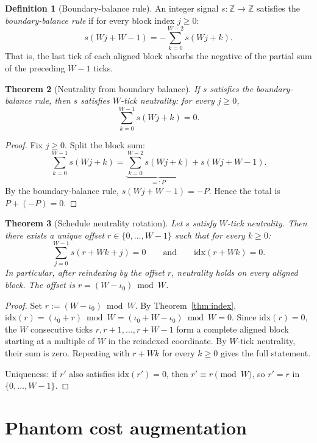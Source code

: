 \documentclass[11pt]{amsart}
\newtheorem{theorem}{Theorem}[section]
\theoremstyle{definition}
\newtheorem{definition}[theorem]{Definition}
\theoremstyle{remark}
\newcommand{\Z}{\mathbb{Z}}
\begin{document}
\begin{definition}[Boundary-balance rule]\label{def:boundary-balance}
An integer signal $s:\Z\to\Z$ satisfies the \emph{boundary-balance rule}
if for every block index $j\ge 0$:
\[
s(Wj+W{-}1)=-\sum_{k=0}^{W-2} s(Wj+k).
\]
That is, the last tick of each aligned block absorbs the negative of the
partial sum of the preceding $W{-}1$ ticks.
\end{definition}

\begin{theorem}[Neutrality from boundary balance]\label{thm:every8th}
If $s$ satisfies the boundary-balance rule, then $s$ satisfies
$W$-tick neutrality: for every $j\ge 0$,
\[
\sum_{k=0}^{W-1} s(Wj+k)=0.
\]
\end{theorem}
\begin{proof}
Fix $j\ge 0$.  Split the block sum:
\[
\sum_{k=0}^{W-1} s(Wj+k)
=\underbrace{\sum_{k=0}^{W-2} s(Wj+k)}_{=:P}+s(Wj+W{-}1).
\]
By the boundary-balance rule, $s(Wj+W{-}1)=-P$.
Hence the total is $P+(-P)=0$.
\end{proof}

\begin{theorem}[Schedule neutrality rotation]\label{thm:rotation}
Let $s$ satisfy $W$-tick neutrality.  Then there exists a unique
offset $r\in\{0,\ldots,W{-}1\}$ such that for every $k\ge 0$:
\[
\sum_{j=0}^{W-1} s(r+Wk+j)=0
\qquad\text{and}\qquad
\mathrm{idx}(r+Wk)=0.
\]
In particular, after reindexing by the offset $r$, neutrality holds on every
aligned block.  The offset is $r=(W-\iota_0)\bmod W$.
\end{theorem}
\begin{proof}
Set $r:=(W-\iota_0)\bmod W$.  By Theorem~\ref{thm:index},
$\mathrm{idx}(r)=(\iota_0+r)\bmod W=(\iota_0+W-\iota_0)\bmod W=0$.
Since $\mathrm{idx}(r)=0$, the $W$ consecutive ticks
$r,r{+}1,\ldots,r{+}W{-}1$ form a complete aligned block starting at a
multiple of $W$ in the reindexed coordinate.
By $W$-tick neutrality, their sum is zero.
Repeating with $r+Wk$ for every $k\ge0$ gives the full statement.

Uniqueness: if $r'$ also satisfies $\mathrm{idx}(r')=0$, then
$r'\equiv r\pmod{W}$, so $r'=r$ in $\{0,\ldots,W{-}1\}$.
\end{proof}

\section{Phantom cost augmentation}\label{sec:bridge}
\end{document}
